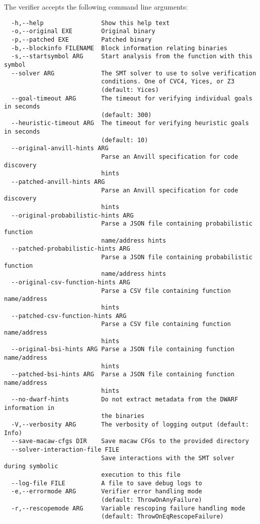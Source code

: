 The verifier accepts the following command line arguments:
\begin{verbatim}
  -h,--help                Show this help text
  -o,--original EXE        Original binary
  -p,--patched EXE         Patched binary
  -b,--blockinfo FILENAME  Block information relating binaries
  -s,--startsymbol ARG     Start analysis from the function with this symbol
  --solver ARG             The SMT solver to use to solve verification
                           conditions. One of CVC4, Yices, or Z3
                           (default: Yices)
  --goal-timeout ARG       The timeout for verifying individual goals in seconds
                           (default: 300)
  --heuristic-timeout ARG  The timeout for verifying heuristic goals in seconds
                           (default: 10)
  --original-anvill-hints ARG
                           Parse an Anvill specification for code discovery
                           hints
  --patched-anvill-hints ARG
                           Parse an Anvill specification for code discovery
                           hints
  --original-probabilistic-hints ARG
                           Parse a JSON file containing probabilistic function
                           name/address hints
  --patched-probabilistic-hints ARG
                           Parse a JSON file containing probabilistic function
                           name/address hints
  --original-csv-function-hints ARG
                           Parse a CSV file containing function name/address
                           hints
  --patched-csv-function-hints ARG
                           Parse a CSV file containing function name/address
                           hints
  --original-bsi-hints ARG Parse a JSON file containing function name/address
                           hints
  --patched-bsi-hints ARG  Parse a JSON file containing function name/address
                           hints
  --no-dwarf-hints         Do not extract metadata from the DWARF information in
                           the binaries
  -V,--verbosity ARG       The verbosity of logging output (default: Info)
  --save-macaw-cfgs DIR    Save macaw CFGs to the provided directory
  --solver-interaction-file FILE
                           Save interactions with the SMT solver during symbolic
                           execution to this file
  --log-file FILE          A file to save debug logs to
  -e,--errormode ARG       Verifier error handling mode
                           (default: ThrowOnAnyFailure)
  -r,--rescopemode ARG     Variable rescoping failure handling mode
                           (default: ThrowOnEqRescopeFailure)

\end{verbatim}

